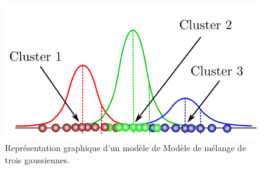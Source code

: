 \begin{figure}[h]
  \centering
  \includegraphics[width=14cm]{./Chapitre2/figures/gmm.png}
  \caption{Représentation graphique d'un modèle de Modèle de mélange de trois gaussiennes.}
  \label{fig:gmm}
\end{figure}

